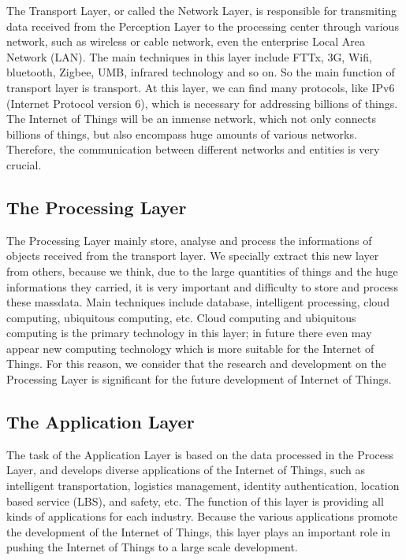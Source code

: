 \documentclass{article}
\begin{document}
The Transport Layer, or called the Network Layer, is responsible for transmiting data received from the Perception Layer to the processing center through various network, such as wireless or cable network, even the enterprise Local Area Network (LAN). The main techniques in this layer include FTTx, 3G, Wifi, bluetooth, Zigbee, UMB, infrared technology and so on. So the main function of transport layer is transport. At this layer, we can find many protocols, like IPv6 (Internet Protocol version 6), which is necessary for addressing billions of things.
The Internet of Things will be an inmense network, which not only connects billions of things, but also encompass huge amounts of various networks. Therefore, the communication between different networks and entities is very crucial.

\subsection{The Processing Layer}

The Processing Layer mainly store, analyse and process
the informations of objects received from the transport layer. We specially extract this new layer from others, because we think, due to the large quantities of things and the huge informations they carried, it is very important and difficulty to store and process these massdata. Main techniques include database, intelligent processing, cloud computing, ubiquitous computing, etc. Cloud computing and ubiquitous computing is the primary technology in this layer; in future there even may appear new computing technology which is more suitable for the Internet of Things. For this reason, we consider that the research and development on the Processing Layer is significant for the future development of Internet of Things.

\subsection{The Application Layer}

The task of the Application Layer is based on the data processed in the Process Layer, and develops diverse applications of the Internet of Things, such as intelligent
transportation, logistics management, identity authentication, location based service (LBS), and safety, etc. The function of this layer is providing all kinds of applications for each industry. Because the various applications promote the development of the Internet of Things, this layer plays an important role in pushing the Internet of Things to a large scale development.
\end{document}
